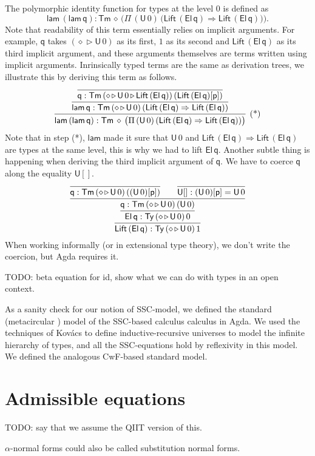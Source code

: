 \documentclass[sigplan,10pt,anonymous,review]{acmart}\settopmatter{printfolios=true,printccs=false,printacmref=false}
\newcommand{\Ra}{\Rightarrow}
\newcommand{\Ty}{\mathsf{Ty}}
\newcommand{\Tm}{\mathsf{Tm}}
\newcommand{\p}{\mathsf{p}}
\newcommand{\q}{\mathsf{q}}
\newcommand{\ext}{\mathop{\triangleright}}
\newcommand{\lam}{\mathsf{lam}}
\newcommand{\U}{\mathsf{U}}
\newcommand{\El}{\mathsf{El}}
\newcommand{\Lift}{\mathsf{Lift}}
\begin{document}
The polymorphic identity function for types at the level 0 is defined
as
\[
\lam\,(\lam\,\q) : \Tm\,\diamond\,\Big(\Pi\,(\U\,0)\,\big(\Lift\,(\El\,\q)\Ra\Lift\,(\El\,\q)\big)\Big).
\]
Note that readability of this term essentially relies on implicit
arguments. For example, $\q$ takes $(\diamond\ext\U\,0)$ as its first,
$1$ as its second and $\Lift\,(\El\,\q)$ as its third implicit
argument, and these arguments themselves are terms written using
implicit arguments. Inrinsically typed terms are the same as
derivation trees, we illustrate this by deriving this term as follows.
\[
\infer[\text{(*)}]{\lam\,(\lam\,\q) : \Tm\,\diamond\,\big(\Pi\,(\U\,0)\,(\Lift\,(\El\,\q)\Ra\Lift\,(\El\,\q))\big)}{\infer{\lam\,\q : \Tm\,(\diamond\ext\U\,0)\,(\Lift\,(\El\,\q)\Ra\Lift\,(\El\,\q))}{\infer{\q : \Tm\,(\diamond\ext\U\,0\ext\Lift\,(\El\,\q))\,(\Lift\,(\El\,\q)[\p])}{}}}
\]
Note that in step (*), $\lam$ made it sure that $\U\,0$ and
$\Lift\,(\El\,\q)\Ra\Lift\,(\El\,\q)$ are types at the same level,
this is why we had to lift $\El\,\q$. Another subtle thing is
happening when deriving the third implicit argument of $\q$. We have
to coerce $\q$ along the equality $\U[]$.
\[
\infer{\Lift\,(\El\,\q) : \Ty\,(\diamond\ext\U\,0)\,1}{\infer{\El\,\q : \Ty\,(\diamond\ext\U\,0)\,0}{\infer{\q : \Tm\,(\diamond\ext\U\,0)\,(\U\,0)}{\infer{\q : \Tm\,(\diamond\ext\U\,0)\,((\U\,0)[\p])}{} && \infer{\U[] : (\U\,0)[\p] = \U\,0}{}}}}
\]
When working informally (or in extensional type theory), we don't
write the coercion, but Agda requires it.

TODO: beta equation for id, show what we can do with types in an open
context.

As a sanity check for our notion of SSC-model, we defined the standard
(metacircular \cite{DBLP:conf/popl/AltenkirchK16}) model of the
SSC-based calculus calculus in Agda. We used the techniques of Kovács
\cite{DBLP:conf/csl/Kovacs22} to define inductive-recursive universes
to model the infinite hierarchy of types, and all the SSC-equations
hold by reflexivity in this model. We defined the analogous CwF-based
standard model.

\section{Admissible equations}
\label{sec:admissible}

TODO: say that we assume the QIIT version of this.

$\alpha$-normal forms could also be called substitution normal forms.
\end{document}
